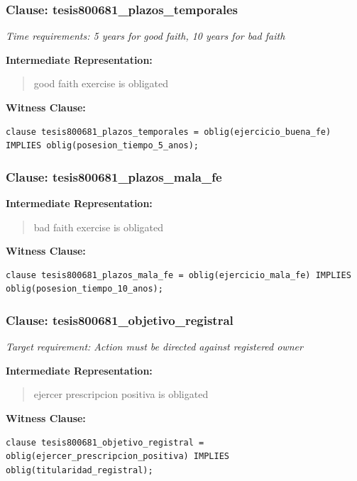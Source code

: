 \documentclass[11pt,a4paper]{article}
\begin{document}
\subsubsection{Clause: tesis800681\_plazos\_temporales}

\textit{Time requirements: 5 years for good faith, 10 years for bad faith}

\textbf{Intermediate Representation:}

\begin{quote}
good faith exercise is obligated
\end{quote}

\textbf{Witness Clause:}

\begin{lstlisting}[style=witnessstyle, language=Witness]
clause tesis800681_plazos_temporales = oblig(ejercicio_buena_fe) IMPLIES oblig(posesion_tiempo_5_anos);
\end{lstlisting}

\subsubsection{Clause: tesis800681\_plazos\_mala\_fe}

\textbf{Intermediate Representation:}

\begin{quote}
bad faith exercise is obligated
\end{quote}

\textbf{Witness Clause:}

\begin{lstlisting}[style=witnessstyle, language=Witness]
clause tesis800681_plazos_mala_fe = oblig(ejercicio_mala_fe) IMPLIES oblig(posesion_tiempo_10_anos);
\end{lstlisting}

\subsubsection{Clause: tesis800681\_objetivo\_registral}

\textit{Target requirement: Action must be directed against registered owner}

\textbf{Intermediate Representation:}

\begin{quote}
ejercer prescripcion positiva is obligated
\end{quote}

\textbf{Witness Clause:}

\begin{lstlisting}[style=witnessstyle, language=Witness]
clause tesis800681_objetivo_registral = oblig(ejercer_prescripcion_positiva) IMPLIES oblig(titularidad_registral);
\end{lstlisting}
\end{document}
